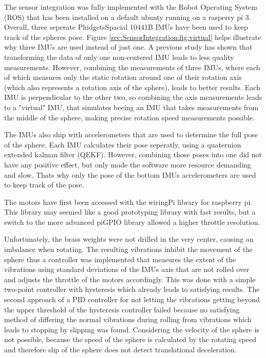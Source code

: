 The sensor integration was fully implemented with the Robot Operating System (ROS) that has been installed on a default ubunty running on a rasperry pi 3.
Overall, three seperate PhidgetsSpacial 10441B IMUs \cite{imuphidgets} have been used to keep track of the spheres pose. Figure \ref{sec:SensorIntegration:fig:virtual} helps illustrate why three IMUs are used instead of just one. A previous study has shown that transforming the data of only one non-centered IMU leads to less quality measurements. However, combining the measurements of three IMUs, where each of which measures only the static rotation around one of their rotation axis (which also represents a rotation axis of the sphere), leads to better results. Each IMU is perpendicular to the other two, so combining the axis measurements leads to a "virtual" IMU, that simulates beeing an IMU that takes measurements from the middle of the sphere, making precise rotation speed measurements possible. 

The IMUs also ship with accelerometers that are used to determine the full pose of the sphere. Each IMU calculates their pose seperatly, using a quaternion extended kalman filter (QEKF). However, combining those poses into one did not have any positive effect, but only made the software more resource demanding and slow. Thats why only the pose of the bottom IMUs accelerometers are used to keep track of the pose.

The motors have first been accessed with the wiringPi library for raspberry pi. This library may seemed like a good prototyping library with fast results, but a switch to the more advanced piGPIO library allowed a higher throttle resolution. 

Unfortunately, the brass weights were not drilled in the very center, causing an imbalance when rotating. The resulting vibrations inhibit the movement of the sphere thus a controller was implemented that measures the extent of the vibrations using standard deviations of the IMUs axis that are not rolled over and adjusts the throttle of the motors accordingly. This was done with a simple two-point controller with hysteresis which already leads to satisfying results. The second approach of a PID controller for not letting the vibrations getting beyond the upper threshold of the hysteresis controller failed because no satisfying method of differing the normal vibrations during rolling from vibrations which leads to stopping by slipping was found. Considering the velocity of the sphere is not possible, because the speed of the sphere is calculated by the rotating speed and therefore slip of the sphere does not detect translational deceleration. 



